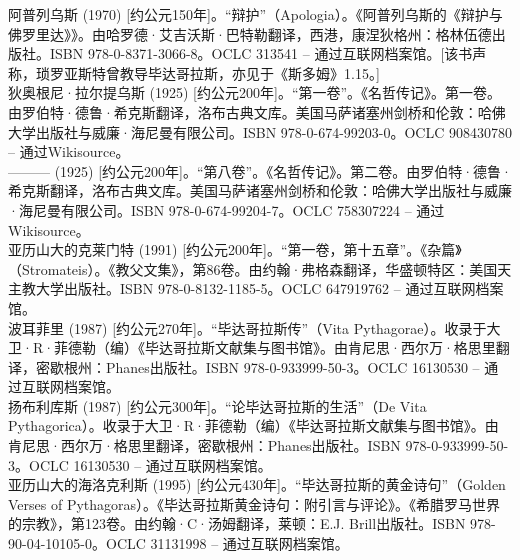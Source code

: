 阿普列乌斯 (1970) [约公元150年]。“辩护”（Apologia）。《阿普列乌斯的《辩护与佛罗里达》》。由哈罗德·艾吉沃斯·巴特勒翻译，西港，康涅狄格州：格林伍德出版社。ISBN 978-0-8371-3066-8。OCLC 313541 – 通过互联网档案馆。[该书声称，琐罗亚斯特曾教导毕达哥拉斯，亦见于《斯多姆》1.15。]\\
狄奥根尼·拉尔提乌斯 (1925) [约公元200年]。“第一卷”。《名哲传记》。第一卷。由罗伯特·德鲁·希克斯翻译，洛布古典文库。美国马萨诸塞州剑桥和伦敦：哈佛大学出版社与威廉·海尼曼有限公司。ISBN 978-0-674-99203-0。OCLC 908430780 – 通过Wikisource。\\
——— (1925) [约公元200年]。“第八卷”。《名哲传记》。第二卷。由罗伯特·德鲁·希克斯翻译，洛布古典文库。美国马萨诸塞州剑桥和伦敦：哈佛大学出版社与威廉·海尼曼有限公司。ISBN 978-0-674-99204-7。OCLC 758307224 – 通过Wikisource。\\
亚历山大的克莱门特 (1991) [约公元200年]。“第一卷，第十五章”。《杂篇》（Stromateis）。《教父文集》，第86卷。由约翰·弗格森翻译，华盛顿特区：美国天主教大学出版社。ISBN 978-0-8132-1185-5。OCLC 647919762 – 通过互联网档案馆。\\
波耳菲里 (1987) [约公元270年]。“毕达哥拉斯传”（Vita Pythagorae）。收录于大卫·R·菲德勒（编）《毕达哥拉斯文献集与图书馆》。由肯尼思·西尔万·格思里翻译，密歇根州：Phanes出版社。ISBN 978-0-933999-50-3。OCLC 16130530 – 通过互联网档案馆。\\
扬布利库斯 (1987) [约公元300年]。“论毕达哥拉斯的生活”（De Vita Pythagorica）。收录于大卫·R·菲德勒（编）《毕达哥拉斯文献集与图书馆》。由肯尼思·西尔万·格思里翻译，密歇根州：Phanes出版社。ISBN 978-0-933999-50-3。OCLC 16130530 – 通过互联网档案馆。\\
亚历山大的海洛克利斯 (1995) [约公元430年]。“毕达哥拉斯的黄金诗句”（Golden Verses of Pythagoras）。《毕达哥拉斯黄金诗句：附引言与评论》。《希腊罗马世界的宗教》，第123卷。由约翰·C·汤姆翻译，莱顿：E.J. Brill出版社。ISBN 978-90-04-10105-0。OCLC 31131998 – 通过互联网档案馆。